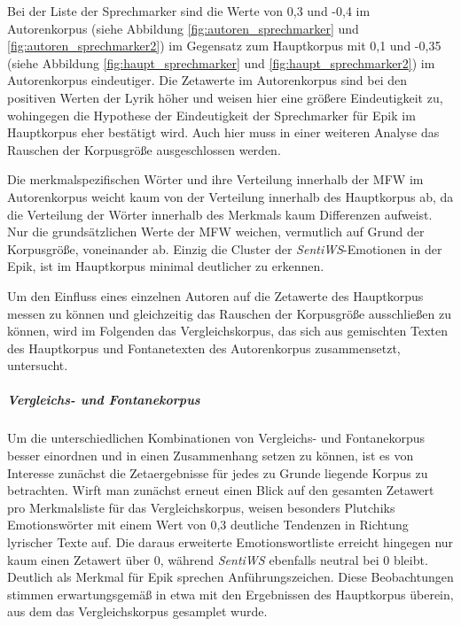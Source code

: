 \documentclass[a4paper,10p]{article}
\begin{document}
Bei der Liste der Sprechmarker sind die Werte von 0,3 und -0,4 im Autorenkorpus (siehe Abbildung \ref{fig:autoren_sprechmarker} und \ref{fig:autoren_sprechmarker2}) im Gegensatz zum Hauptkorpus mit 0,1 und -0,35 (siehe Abbildung \ref{fig:haupt_sprechmarker} und \ref{fig:haupt_sprechmarker2}) im Autorenkorpus eindeutiger. Die Zetawerte im Autorenkorpus sind bei den positiven Werten der Lyrik höher und weisen hier eine größere Eindeutigkeit zu, wohingegen die Hypothese der Eindeutigkeit der Sprechmarker für Epik im Hauptkorpus eher bestätigt wird. Auch hier muss in einer weiteren Analyse das Rauschen der Korpusgröße ausgeschlossen werden. \par 

Die merkmalspezifischen Wörter und ihre Verteilung innerhalb der MFW im Autorenkorpus weicht kaum von der Verteilung innerhalb des Hauptkorpus ab, da die Verteilung der Wörter innerhalb des Merkmals kaum Differenzen aufweist. Nur die grundsätzlichen Werte der MFW weichen, vermutlich auf Grund der Korpusgröße, voneinander ab. Einzig die Cluster der \emph{SentiWS}-Emotionen in der Epik, ist im Hauptkorpus minimal deutlicher zu erkennen. \par 

Um den Einfluss eines einzelnen Autoren auf die Zetawerte des Hauptkorpus messen zu können und gleichzeitig das Rauschen der Korpusgröße ausschließen zu können, wird im Folgenden das Vergleichskorpus, das sich aus gemischten Texten des Hauptkorpus und Fontanetexten des Autorenkorpus zusammensetzt, untersucht. 

\subparagraph{Vergleichs- und Fontanekorpus} \quad \par 

Um die unterschiedlichen Kombinationen von Ver\-gleichs- und Fontanekorpus besser einordnen und in einen Zusammenhang setzen zu können, ist es von Interesse zunächst die Zetaergebnisse für jedes zu Grunde liegende Korpus zu betrachten. Wirft man zunächst erneut einen Blick auf den gesamten Zetawert pro Merkmalsliste für das Vergleichskorpus, weisen besonders Plutchiks Emotionswörter mit einem Wert von 0,3  deutliche Tendenzen in Richtung lyrischer Texte auf. Die daraus erweiterte Emotionswortliste erreicht hingegen nur kaum einen Zetawert über 0, während \textit{SentiWS} ebenfalls neutral bei 0 bleibt. Deutlich als Merkmal für Epik sprechen Anführungszeichen. Diese Beobachtungen stimmen erwartungsgemäß in etwa mit den Ergebnissen des Hauptkorpus überein, aus dem das Vergleichskorpus gesamplet wurde.
\end{document}

